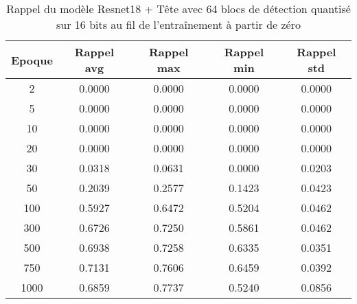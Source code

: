 \begin{table}[!ht]
    \caption{Rappel du modèle Resnet18 + Tête avec 64 blocs de détection quantisé sur 16 bits au fil de l'entraînement à partir de zéro}
    \label{tab:qresnet18+head_64n_rappel_16b_from_scratch}
    \centering
    \begin{tabular}{ |c||c|c|c|c|  }
        \hline
        \rowcolor{gray!50}
        Epoque & Rappel avg & Rappel max & Rappel min & Rappel std\\
        \hline
        2 & 0.0000 & 0.0000 & 0.0000 & 0.0000\\
        5 & 0.0000 & 0.0000 & 0.0000 & 0.0000\\
        10 & 0.0000 & 0.0000 & 0.0000 & 0.0000\\
        20 & 0.0000 & 0.0000 & 0.0000 & 0.0000\\
        30 & 0.0318 & 0.0631 & 0.0000 & 0.0203\\
        50 & 0.2039 & 0.2577 & 0.1423 & 0.0423\\
        100 & 0.5927 & 0.6472 & 0.5204 & 0.0462\\
        300 & 0.6726 & 0.7250 & 0.5861 & 0.0462\\
        500 & 0.6938 & 0.7258 & 0.6335 & 0.0351\\
        750 & 0.7131 & 0.7606 & 0.6459 & 0.0392\\
        1000 & 0.6859 & 0.7737 & 0.5240 & 0.0856\\
        \hline
    \end{tabular}
\end{table}

